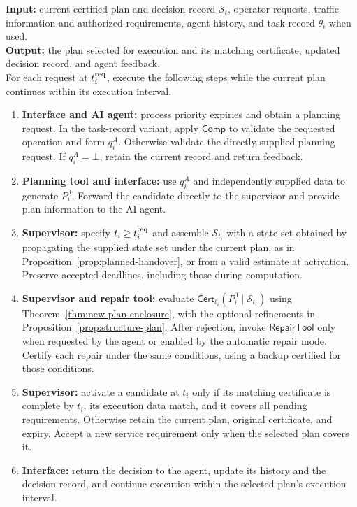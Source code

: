 \documentclass[preprint,12pt]{elsarticle}
\theoremstyle{definition}
\theoremstyle{plain}
\theoremstyle{definition}
\theoremstyle{plain}
\begin{document}
\begin{algorithm}[!htbp]
\caption{Planning requests and certified execution}
\label{alg:agent-execution}
\begin{minipage}{\linewidth}
\small
\textbf{Input:} current certified plan and decision record
$\mathcal S_t$, operator requests, traffic information and authorized
requirements, agent history, and task record $\theta_i$ when used.\\
\textbf{Output:} the plan selected for execution and its matching
certificate, updated decision record, and agent feedback.\\
For each request at $t_i^{\rm req}$, execute the following steps while
the current plan continues within its execution interval.
\begin{enumerate}
\setlength{\itemsep}{2pt}
\item \label{step:request}\textbf{Interface and AI agent:}
process priority expiries and obtain a planning request. In the task-record
variant, apply $\mathsf{Comp}$ to validate the requested operation and
form $q_i^A$. Otherwise validate the directly supplied planning request.
If $q_i^A=\bot$, retain the current record and return feedback.
\item \label{step:planning}\textbf{Planning tool and interface:}
use $q_i^A$ and independently supplied data to generate $P_i^0$.
Forward the candidate directly to the supervisor and provide plan
information to the AI agent.
\item \label{step:activation}\textbf{Supervisor:}
specify $t_i\ge t_i^{\rm req}$ and assemble $\mathcal S_{t_i}$ with
a state set obtained by propagating the supplied state set under the
current plan, as in Proposition~\ref{prop:planned-handover}, or from a
valid estimate at activation. Preserve accepted deadlines, including those
during computation.
\item \label{step:checking}\textbf{Supervisor and repair tool:}
evaluate $\mathsf{Cert}_{t_i}(P_i^0\mid\mathcal S_{t_i})$ using
Theorem~\ref{thm:new-plan-enclosure}, with the optional refinements in
Proposition~\ref{prop:structure-plan}.
After rejection, invoke $\mathsf{RepairTool}$ only when requested by the
agent or enabled by the automatic repair mode. Certify each repair under
the same conditions, using a backup certified for those conditions.
\item \label{step:installation}\textbf{Supervisor:}
activate a candidate at $t_i$ only if its matching certificate is complete
by $t_i$, its execution data match, and it covers all pending
requirements. Otherwise retain the current plan, original certificate,
and expiry. Accept a new service requirement only when the selected plan
covers it.
\item \label{step:feedback}\textbf{Interface:}
return the decision to the agent, update its history and the decision
record, and continue execution within the selected plan's execution interval.
\end{enumerate}
\end{minipage}
\end{algorithm}
\end{document}
